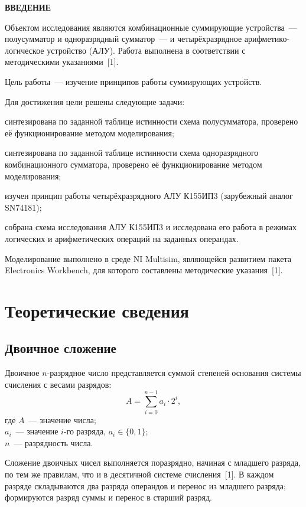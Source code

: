 \documentclass[14pt,a4paper]{extarticle}
\newcommand{\structsection}[1]{%
  \clearpage
  \phantomsection
  \addcontentsline{toc}{section}{#1}%
  \begin{center}\textbf{#1}\end{center}\vspace{6pt}}
\begin{document}
\structsection{ВВЕДЕНИЕ}

Объектом исследования являются комбинационные суммирующие устройства~--- полусумматор и одноразрядный сумматор~--- и четырёхразрядное арифметико-логическое устройство (АЛУ). Работа выполнена в соответствии с методическими указаниями~[1].

Цель работы~--- изучение принципов работы суммирующих устройств.

Для достижения цели решены следующие задачи:
\begin{gostlist}
\item синтезирована по заданной таблице истинности схема полусумматора, проверено её функционирование методом моделирования;
\item синтезирована по заданной таблице истинности схема одноразрядного комбинационного сумматора, проверено её функционирование методом моделирования;
\item изучен принцип работы четырёхразрядного АЛУ К155ИП3 (зарубежный аналог SN74181);
\item собрана схема исследования АЛУ К155ИП3 и исследована его работа в режимах логических и арифметических операций на заданных операндах.
\end{gostlist}

Моделирование выполнено в среде NI Multisim, являющейся развитием пакета Electronics Workbench, для которого составлены методические указания~[1].

\clearpage
\section{Теоретические сведения}

\subsection{Двоичное сложение}

Двоичное $n$-разрядное число представляется суммой степеней основания системы счисления с весами разрядов:
\begin{equation}
A = \sum_{i=0}^{n-1} a_i \cdot 2^i,
\end{equation}
\noindent где $A$~--- значение числа;\\
$a_i$~--- значение $i$-го разряда, $a_i \in \{0, 1\}$;\\
$n$~--- разрядность числа.

Сложение двоичных чисел выполняется поразрядно, начиная с младшего разряда, по тем же правилам, что и в десятичной системе счисления~[1]. В каждом разряде складываются два разряда операндов и перенос из младшего разряда; формируются разряд суммы и перенос в старший разряд.
\end{document}
